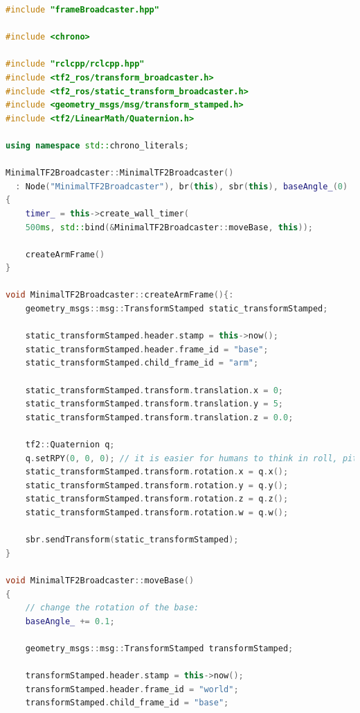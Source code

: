 \begin{lstlisting}[language=C++, caption={frameBroadcaster.hpp; Een node met twee broadcasters. De twee frames maken samen een 1 DOF-robotarm (zie figuur \ref{fig:1DOFRobotarm}). De base frame definieert zichzelf met een locatie en oriëntatie in relatie tot de world frame. De arm frame doet dit ook, maar dan in relatie tot de base frame.}, firstnumber=0, label={code:frameBroadcaster.cpp}]
#include "frameBroadcaster.hpp"

#include <chrono>

#include "rclcpp/rclcpp.hpp"
#include <tf2_ros/transform_broadcaster.h>
#include <tf2_ros/static_transform_broadcaster.h>
#include <geometry_msgs/msg/transform_stamped.h>
#include <tf2/LinearMath/Quaternion.h>

using namespace std::chrono_literals;

MinimalTF2Broadcaster::MinimalTF2Broadcaster()
  : Node("MinimalTF2Broadcaster"), br(this), sbr(this), baseAngle_(0)
{
    timer_ = this->create_wall_timer(
    500ms, std::bind(&MinimalTF2Broadcaster::moveBase, this));

    createArmFrame()
}

void MinimalTF2Broadcaster::createArmFrame(){:
    geometry_msgs::msg::TransformStamped static_transformStamped;

    static_transformStamped.header.stamp = this->now();
    static_transformStamped.header.frame_id = "base";
    static_transformStamped.child_frame_id = "arm";
    
    static_transformStamped.transform.translation.x = 0;
    static_transformStamped.transform.translation.y = 5;
    static_transformStamped.transform.translation.z = 0.0;

    tf2::Quaternion q;
    q.setRPY(0, 0, 0); // it is easier for humans to think in roll, pitch and yaw.
    static_transformStamped.transform.rotation.x = q.x();
    static_transformStamped.transform.rotation.y = q.y();
    static_transformStamped.transform.rotation.z = q.z();
    static_transformStamped.transform.rotation.w = q.w();

    sbr.sendTransform(static_transformStamped);
}

void MinimalTF2Broadcaster::moveBase()
{
    // change the rotation of the base:
    baseAngle_ += 0.1;

    geometry_msgs::msg::TransformStamped transformStamped;

    transformStamped.header.stamp = this->now();
    transformStamped.header.frame_id = "world";
    transformStamped.child_frame_id = "base";


\end{lstlisting}
